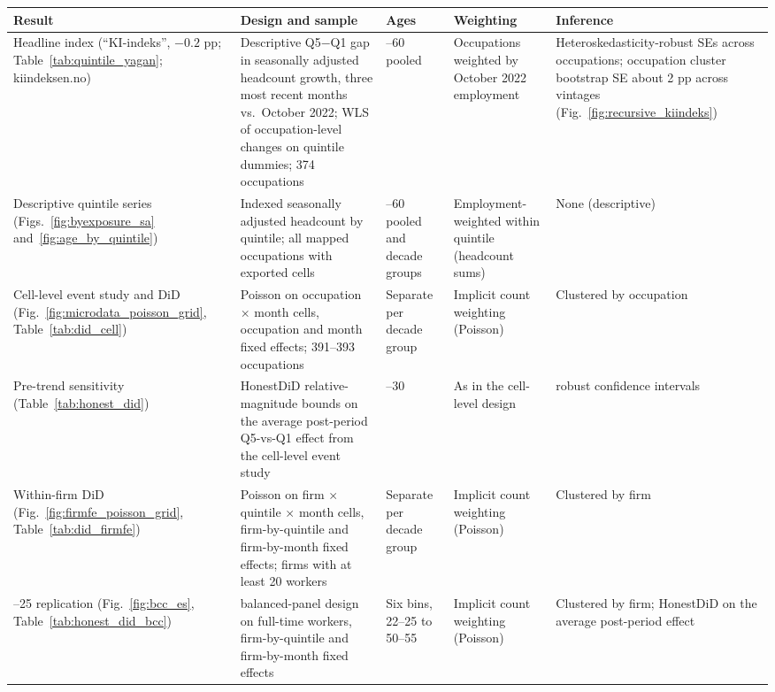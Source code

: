\footnotesize
\begin{tabularx}{\textwidth}{@{}>{\raggedright\arraybackslash}p{3.2cm} X >{\raggedright\arraybackslash}p{1.8cm} >{\raggedright\arraybackslash}p{2.4cm} >{\raggedright\arraybackslash}p{3.0cm}@{}}
\toprule
Result & Design and sample & Ages & Weighting & Inference \\
\midrule
Headline index (``KI-indeks'', $-0.2$ pp; Table~\ref{tab:quintile_yagan}; kiindeksen.no) & Descriptive Q5$-$Q1 gap in seasonally adjusted headcount growth, three most recent months vs.\ October 2022; WLS of occupation-level changes on quintile dummies; 374 occupations & 21--60 pooled & Occupations weighted by October 2022 employment & Heteroskedasticity-robust SEs across occupations; occupation cluster bootstrap SE about 2 pp across vintages (Fig.~\ref{fig:recursive_kiindeks}) \\[4pt]
Descriptive quintile series (Figs.~\ref{fig:byexposure_sa} and~\ref{fig:age_by_quintile}) & Indexed seasonally adjusted headcount by quintile; all mapped occupations with exported cells & 21--60 pooled and decade groups & Employment-weighted within quintile (headcount sums) & None (descriptive) \\[4pt]
Cell-level event study and DiD (Fig.~\ref{fig:microdata_poisson_grid}, Table~\ref{tab:did_cell}) & Poisson on occupation $\times$ month cells, occupation and month fixed effects; 391--393 occupations & Separate per decade group & Implicit count weighting (Poisson) & Clustered by occupation \\[4pt]
Pre-trend sensitivity (Table~\ref{tab:honest_did}) & HonestDiD relative-magnitude bounds on the average post-period Q5-vs-Q1 effect from the cell-level event study & 21--30 & As in the cell-level design & \citet{rambachan2023} robust confidence intervals \\[4pt]
Within-firm DiD (Fig.~\ref{fig:firmfe_poisson_grid}, Table~\ref{tab:did_firmfe}) & Poisson on firm $\times$ quintile $\times$ month cells, firm-by-quintile and firm-by-month fixed effects; firms with at least 20 workers & Separate per decade group & Implicit count weighting (Poisson) & Clustered by firm \\[4pt]
22--25 replication (Fig.~\ref{fig:bcc_es}, Table~\ref{tab:honest_did_bcc}) & \citet{brynjolfsson2025} balanced-panel design on full-time workers, firm-by-quintile and firm-by-month fixed effects & Six bins, 22--25 to 50--55 & Implicit count weighting (Poisson) & Clustered by firm; HonestDiD on the average post-period effect \\
\bottomrule
\end{tabularx}
